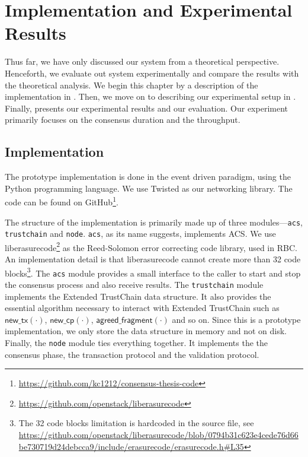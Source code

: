 \chapter{Implementation and Experimental Results}
\label{ch:implementation}

Thus far, we have only discussed our system from a theoretical perspective.
Henceforth, we evaluate out system experimentally and compare the results with the theoretical analysis.
We begin this chapter by a description of the implementation in .
Then, we move on to describing our experimental setup in .
Finally,  presents our experimental results and our evaluation.
Our experiment primarily focuses on the consensus duration and the throughput.


\section{Implementation}
\label{sec:implementation}

The prototype implementation is done in the event driven paradigm, using the Python programming language.
We use Twisted as our networking library.
The code can be found on GitHub\footnote{\url{https://github.com/kc1212/consensus-thesis-code}}.

The structure of the implementation is primarily made up of three modules---\texttt{acs}, \texttt{trustchain} and \texttt{node}.
\texttt{acs}, as its name suggests, implements ACS.
We use liberasurecode\footnote{\url{https://github.com/openstack/liberasurecode}} as the Reed-Solomon error correcting code library, used in RBC.
An implementation detail is that liberasurecode cannot create more than 32 code blocks\footnote{
  The 32 code blocks limitation is hardcoded in the source file, see
  \url{https://github.com/openstack/liberasurecode/blob/0794b31c623e4cede76d66be730719d24debcca9/include/erasurecode/erasurecode.h\#L35}
}.
The \texttt{acs} module provides a small interface to the caller to start and stop the consensus process and also receive results.
The \texttt{trustchain} module implements the Extended TrustChain data structure.
It also provides the essential algorithm necessary to interact with Extended TrustChain such as 
$\textsf{new\_tx}(\cdot)$, $\textsf{new\_cp}(\cdot)$, $\textsf{agreed\_fragment}(\cdot)$ and so on.
Since this is a prototype implementation, we only store the data structure in memory and not on disk.
Finally, the \texttt{node} module ties everything together.
It implements the the consensus phase, the transaction protocol and the validation protocol.

